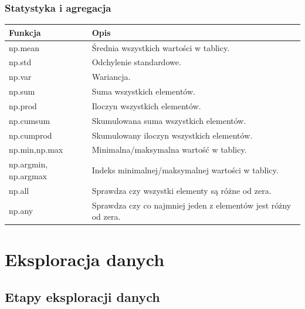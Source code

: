 \documentclass[
  polish,
  letterpaper,
  DIV=11,
  numbers=noendperiod]{scrreprt}
\newcounter{none} %
\begin{document}
\section{Statystyka i agregacja}\label{statystyka-i-agregacja}

{\def\LTcaptype{none} %
\begin{longtable}[]{@{}
  >{\raggedright\arraybackslash}p{}
  >{\raggedright\arraybackslash}p{}@{}}
\toprule\noalign{}
\begin{minipage}[b]{\linewidth}\raggedright
Funkcja
\end{minipage} & \begin{minipage}[b]{\linewidth}\raggedright
Opis
\end{minipage} \\
\midrule\noalign{}
\endhead
\bottomrule\noalign{}
\endlastfoot
np.mean & Średnia wszystkich wartości w tablicy. \\
np.std & Odchylenie standardowe. \\
np.var & Wariancja. \\
np.sum & Suma wszystkich elementów. \\
np.prod & Iloczyn wszystkich elementów. \\
np.cumsum & Skumulowana suma wszystkich elementów. \\
np.cumprod & Skumulowany iloczyn wszystkich elementów. \\
np.min,np.max & Minimalna/maksymalna wartość w tablicy. \\
np.argmin, np.argmax & Indeks minimalnej/maksymalnej wartości w
tablicy. \\
np.all & Sprawdza czy wszystki elementy są różne od zera. \\
np.any & Sprawdza czy co najmniej jeden z elementów jest różny od
zera. \\
\end{longtable}
}

\part{Eksploracja danych}

\chapter{Etapy eksploracji danych}\label{etapy-eksploracji-danych}
\end{document}
